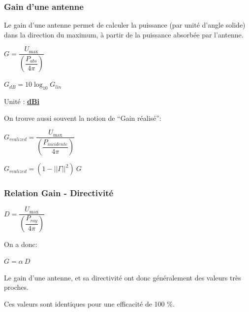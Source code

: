 \documentclass[
10pt,
aspectratio=169,
]{beamer}
\begin{document}
\begin{frame}
\frametitle{Gain d'une antenne}

Le gain d'une antenne permet de calculer la puissance (par unité
d'angle solide) dans la direction du maximum, à partir de la
puissance absorbée par l'antenne.

\begin{minipage}{0.35\textwidth}
\begin{tcolorbox}[colframe=red,width=4cm]
\center$G=\dfrac{U_{\max}}{\left(\dfrac{P_{abs}}{4\pi}\right)}$
\end{tcolorbox}
\end{minipage}
\begin{minipage}{0.35\textwidth}
\begin{tcolorbox}[colframe=red,width=4.5cm]
\center$G_{dB}=10\log_{10}G_{lin}$
\end{tcolorbox}
\end{minipage}
\begin{minipage}{0.2\textwidth}
Unité : \underline{\textbf{dBi}}
\end{minipage}

\vspace{0.5cm}
On trouve aussi souvent la notion de ``Gain réalisé'':

\begin{center}
\begin{tcolorbox}[colframe=red,width=6cm]
\center$G_{realized}=\dfrac{U_{\max}}{\left(\dfrac{P_{incidente}}{4\pi}\right)}$
\end{tcolorbox}

\begin{tcolorbox}[colframe=red,width=5cm]
\center$G_{realized}=(1-||\Gamma||^2) \ G$
\end{tcolorbox}
\end{center}

\end{frame}

\begin{frame}
\frametitle{Relation Gain - Directivité}

\begin{tcolorbox}[colframe=red,width=4cm]
\center$D=\dfrac{U_{\max}}{\left(\dfrac{P_{ray}}{4\pi}\right)}$
\end{tcolorbox}

\vspace{0.5cm}
On a donc:
\begin{tcolorbox}[colframe=red,width=5cm]
\center$G=\alpha \ D$
\end{tcolorbox}

\vspace{0.5cm}
Le gain d'une antenne, et sa directivité ont donc généralement
des valeurs très proches.

\vspace{0.5cm}
Ces valeurs sont identiques pour une efficacité de 100 \%.

\end{frame}
\end{document}
